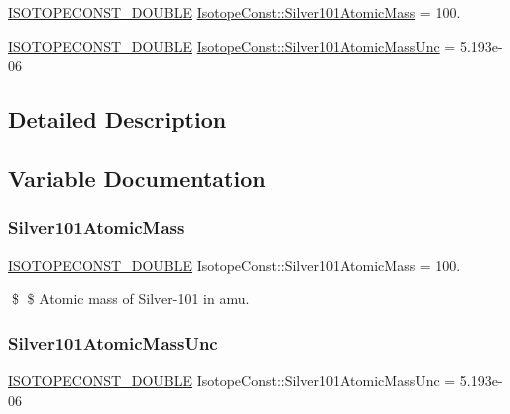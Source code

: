 \begin{DoxyCompactItemize}
\item 
\mbox{\hyperlink{group___isotope_const-_macros_ga8f45a7272ce02c0b4c65c44636ed719a}{I\+S\+O\+T\+O\+P\+E\+C\+O\+N\+S\+T\+\_\+\+D\+O\+U\+B\+LE}} \mbox{\hyperlink{group___isotope_const-_silver-_ag101_gaac6d84f88742266395794bd0bb8f752f}{Isotope\+Const\+::\+Silver101\+Atomic\+Mass}} = 100.
\item 
\mbox{\hyperlink{group___isotope_const-_macros_ga8f45a7272ce02c0b4c65c44636ed719a}{I\+S\+O\+T\+O\+P\+E\+C\+O\+N\+S\+T\+\_\+\+D\+O\+U\+B\+LE}} \mbox{\hyperlink{group___isotope_const-_silver-_ag101_ga5b81ea04494679807710cfd1668e3159}{Isotope\+Const\+::\+Silver101\+Atomic\+Mass\+Unc}} = 5.\+193e-\/06
\end{DoxyCompactItemize}


\subsection{Detailed Description}


\subsection{Variable Documentation}
\mbox{\label{group___isotope_const-_silver-_ag101_gaac6d84f88742266395794bd0bb8f752f}} 
\subsubsection{\texorpdfstring{Silver101\+Atomic\+Mass}{Silver101AtomicMass}}
{\footnotesize\ttfamily \mbox{\hyperlink{group___isotope_const-_macros_ga8f45a7272ce02c0b4c65c44636ed719a}{I\+S\+O\+T\+O\+P\+E\+C\+O\+N\+S\+T\+\_\+\+D\+O\+U\+B\+LE}} Isotope\+Const\+::\+Silver101\+Atomic\+Mass = 100.}

\$ \$ Atomic mass of Silver-\/101 in amu. \mbox{\label{group___isotope_const-_silver-_ag101_ga5b81ea04494679807710cfd1668e3159}} 
\subsubsection{\texorpdfstring{Silver101\+Atomic\+Mass\+Unc}{Silver101AtomicMassUnc}}
{\footnotesize\ttfamily \mbox{\hyperlink{group___isotope_const-_macros_ga8f45a7272ce02c0b4c65c44636ed719a}{I\+S\+O\+T\+O\+P\+E\+C\+O\+N\+S\+T\+\_\+\+D\+O\+U\+B\+LE}} Isotope\+Const\+::\+Silver101\+Atomic\+Mass\+Unc = 5.\+193e-\/06}

